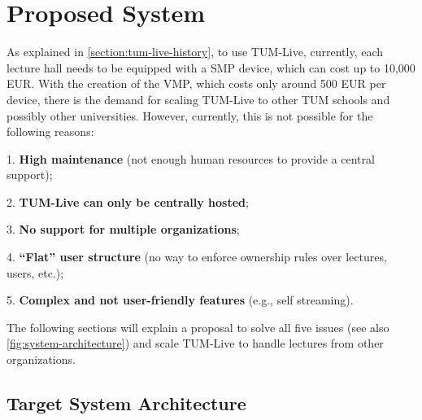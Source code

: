 \section{Proposed System}

As explained in \autoref{section:tum-live-history}, to use TUM-Live, currently, each lecture hall needs to be equipped with a \ac{SMP} device, which can cost up to 10,000 EUR. With the creation of the \ac{VMP}, which costs only around 500 EUR per device, there is the demand for scaling TUM-Live to other \ac{TUM} schools and possibly other universities. However, currently, this is not possible for the following reasons: 

1. \textbf{High maintenance} (not enough human resources to provide a central support);

2. \textbf{TUM-Live can only be centrally hosted};

3. \textbf{No support for multiple organizations};

4. \textbf{“Flat” user structure} (no way to enforce ownership rules over lectures, users, etc.);

5. \textbf{Complex and not user-friendly features} (e.g., self streaming).

\noindent The following sections will explain a proposal to solve all five issues (see also \autoref{fig:system-architecture}) and scale TUM-Live to handle lectures from other organizations.

\subsection{Target System Architecture}


